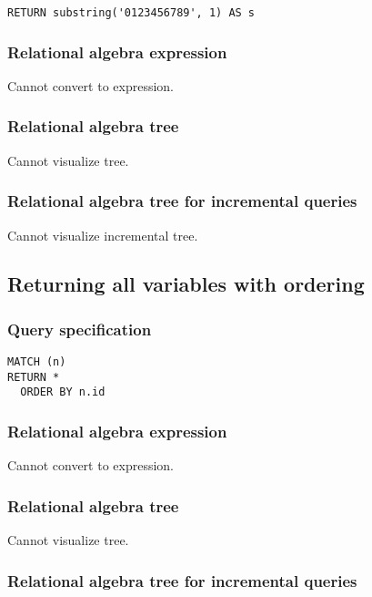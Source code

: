 \begin{lstlisting}
RETURN substring('0123456789', 1) AS s
\end{lstlisting}

\subsubsection*{Relational algebra expression}

Cannot convert to expression.

\subsubsection*{Relational algebra tree}

Cannot visualize tree.

\subsubsection*{Relational algebra tree for incremental queries}

Cannot visualize incremental tree.

\subsection{Returning all variables with ordering}

\subsubsection*{Query specification}

\begin{lstlisting}
MATCH (n)
RETURN *
  ORDER BY n.id
\end{lstlisting}

\subsubsection*{Relational algebra expression}

Cannot convert to expression.

\subsubsection*{Relational algebra tree}

Cannot visualize tree.

\subsubsection*{Relational algebra tree for incremental queries}


